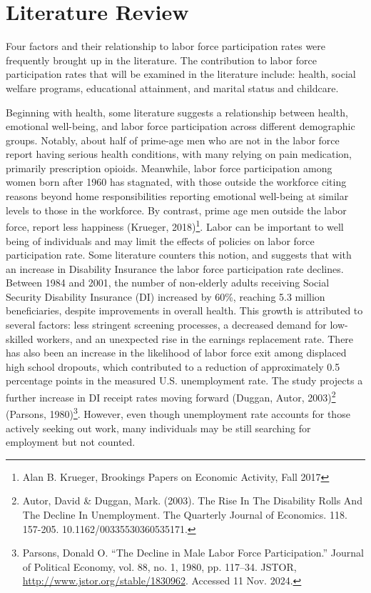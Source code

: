 \chapter{Literature Review}

Four factors and their relationship to labor force participation rates were frequently brought up in the literature. The contribution to labor force participation rates that will be examined in the literature include: health, social welfare programs, educational attainment, and marital status and childcare.

Beginning with health, some literature suggests a relationship between health, emotional well-being, and labor force participation across different demographic groups. Notably, about half of prime-age men who are not in the labor force report having serious health conditions, with many relying on pain medication, primarily prescription opioids. Meanwhile, labor force participation among women born after 1960 has stagnated, with those outside the workforce citing reasons beyond home responsibilities reporting emotional well-being at similar levels to those in the workforce. By contrast, prime age men outside the labor force, report less happiness (Krueger, 2018)\footnote{Alan B. Krueger, Brookings Papers on Economic Activity, Fall 2017}. Labor can be important to well being of individuals and may limit the effects of policies on labor force participation rate. Some literature counters this notion, and suggests that with an increase in Disability Insurance the labor force participation rate declines. Between 1984 and 2001, the number of non-elderly adults receiving Social Security Disability Insurance (DI) increased by 60\%, reaching 5.3 million beneficiaries, despite improvements in overall health. This growth is attributed to several factors: less stringent screening processes, a decreased demand for low-skilled workers, and an unexpected rise in the earnings replacement rate. There has also been an increase in the likelihood of labor force exit among displaced high school dropouts, which contributed to a reduction of approximately 0.5 percentage points in the measured U.S. unemployment rate. The study projects a further increase in DI receipt rates moving forward (Duggan, Autor, 2003)\footnote{Autor, David \& Duggan, Mark. (2003). The Rise In The Disability Rolls And The Decline In Unemployment. The Quarterly Journal of Economics. 118. 157-205. 10.1162/00335530360535171.} (Parsons, 1980)\footnote{Parsons, Donald O. ``The Decline in Male Labor Force Participation.'' Journal of Political Economy, vol. 88, no. 1, 1980, pp. 117--34. JSTOR, \href{http://www.jstor.org/stable/1830962}{http://www.jstor.org/stable/1830962}. Accessed 11 Nov. 2024.}. However, even though unemployment rate accounts for those actively seeking out work, many individuals may be still searching for employment but not counted.

